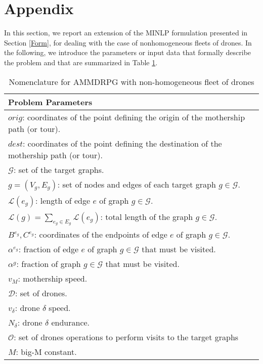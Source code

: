 \section{Appendix}\label{App}
\noindent
In this section, we report an extension of the MINLP formulation presented in Section \ref{Form}, for dealing with the case of nonhomogeneous fleets of drones.
\noindent
In the following, we introduce the parameters or input data that formally describe the problem and that are summarized in Table \ref{table:At1}.


\begin{table}[!h]
\scriptsize
\centering
\begin{tabular}{ | l | }
\hline
\textbf{Problem Parameters}\\
\hline
$orig$: coordinates of the point defining the origin of the mothership path (or tour).\\
$dest$: coordinates of the point defining the destination of the mothership path (or tour).\\
$\mathcal{G}$: set of the target graphs.\\
$g = (V_g, E_g)$: set of nodes and edges of each target graph $g \in \mathcal{G}$.\\
$\mathcal{L}(e_g)$: length of edge $e$ of graph $g \in \mathcal{G}$.\\
$\mathcal{L}(g)=\sum_{e_g\in E_g} \mathcal L(e_g)$: total length of the graph $g\in\mathcal G$.\\
$B^{e_g}, C^{e_g}$: coordinates of the endpoints of edge $e$ of graph $g \in \mathcal{G}$.\\
$\alpha^{e_g}$: fraction of edge $e$ of graph $g \in \mathcal{G}$ that must be visited.\\
$\alpha^{g}$: fraction of graph $g \in \mathcal{G}$ that must be visited.\\
$v_M$: mothership speed.\\
$\mathcal D$: set of drones.\\
$v_\delta$: drone $\delta$ speed.\\
$N_\delta$: drone $\delta$ endurance. \\
$\mathcal{O}$: set of drones operations to perform visits to the target graphs\\
$M$: big-M constant.\\
\hline
\end{tabular}
\caption{Nomenclature for AMMDRPG with non-homogeneous fleet of drones}
\label{table:At1}
\end{table}

